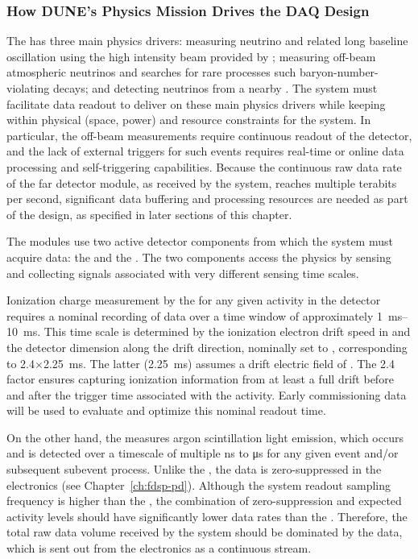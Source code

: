 \subsubsection{How DUNE's Physics Mission Drives the DAQ Design}

The   has three main physics drivers: measuring neutrino  and related
long baseline oscillation using the high intensity beam provided
by \fnal; measuring off-beam atmospheric neutrinos and searches
for rare processes such baryon-number-violating decays;
and detecting neutrinos from a nearby . The
   system must facilitate data
readout to deliver on these main physics drivers while keeping
within physical (space, power) and resource constraints for
the system. In particular, the off-beam measurements require continuous readout of the detector, 
and the lack of external triggers for such
events requires real-time or online data processing and
self-triggering capabilities. Because the
continuous raw data rate of the far detector module, as received by
the  system, reaches multiple
terabits per second, significant data buffering and processing
resources are needed as part of the design, as specified in
later sections of this chapter.

The   modules use two active detector components from which the 
 system must acquire data: the  and the . 
The two components access the physics by sensing and collecting signals associated with very different sensing time scales.

Ionization charge measurement by the  for any given activity in the detector 
requires a nominal recording of data over a time window of approximately \SIrange{1}{10}{\milli\second}. 
This time scale is determined by the ionization electron drift speed in  and the detector 
dimension along the drift direction, nominally set to 
\spreadout, 
corresponding to 2.4$\times$\SI{2.25}{\milli\second}.
The latter (\SI{2.25}{\milli\second}) assumes a drift electric field of \mindriftfieldgoal.
The 2.4 factor ensures capturing ionization information from at
least a full drift before and after the trigger time associated with the
activity. 
Early commissioning data will be used to evaluate and optimize this nominal readout time.

On the other hand, the  measures argon scintillation light emission, which
occurs and is detected over a timescale of multiple \si{\nano\second} to
\si{\micro\second} for
any given event and/or subsequent subevent process. Unlike the ,
the  data is zero-suppressed in
the  electronics (see Chapter~\ref{ch:fdsp-pd}). Although
the  system readout sampling frequency is higher than the , the combination of zero-suppression and expected activity
levels should have significantly lower data rates than the . Therefore, the total raw data volume received by
the  system should be dominated by
the  data, which is sent out from the  electronics as a continuous stream.
 
